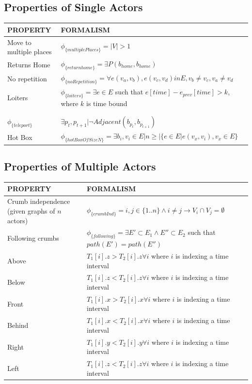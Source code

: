 \subsection{Properties of Single Actors}


\begin{tabular}{| p{2.8cm} | p{11.5cm} | }
\hline
PROPERTY & FORMALISM \\ \hline
Move to multiple places & $\phi_{\{multiplePlaces\}} = |V| > 1$ \\ \hline
Returns Home & $\phi_{\{returnhome\}} = \exists P(b_{home}, b_{home})$ \\ \hline
No repetition & $\phi_{\{noRepetition\}} = \forall e(v_a, v_b), e(v_c,v_d) in E, v_b \neq v_c, v_a \neq v_d$ \\ \hline
 Loiters & $\phi_{\{loiters\}} =  \exists e \in E$ such that $e[time] - e_{prev}[time] > k$, where $k$ is time bound \\ \hline
 & \\ \hline
 & \\ \hline
$\phi_{\{teleport\}}$ & $  \exists  p_t, p_{t+1} | \lnot Adjacent(b_{p_t}, b_{p_{t+1}})$ \\ \hline
Hot Box & $\phi_{\{hotBoxOfSizeN\}} = \exists b_i, v_i \in E | n \geq |\{e \in E | e(v_x, v_i), v_x \in E\}$ \\ \hline
\end{tabular}


\subsection{Properties of Multiple Actors}
\begin{tabular}{| p{2.8cm} | p{11.5cm} | }
\hline
PROPERTY & FORMALISM \\ \hline
 Crumb independence (given graphs of $n$ actors)& $\phi_{\{crumbInd\}} =  i,j \in \{1..n\} \land i \neq j \rightarrow V_i \cap V_j = \emptyset $ \\ \hline
 Following crumbs & $\phi_{\{following\}} =  \exists E' \subset E_1 \land E'' \subset E_2$ such that $path(E')=path(E'') $  \\ \hline
 Above & $T_1[i].z > T_2[i].z \forall i$ where $i$ is indexing a time interval\\ \hline
 Below & $T_1[i].z < T_2[i].z \forall i$ where $i$ is indexing a time interval\\ \hline
 Front & $T_1[i].x > T_2[i].x \forall i$ where $i$ is indexing a time interval\\ \hline
 Behind & $T_1[i].x < T_2[i].x \forall i$ where $i$ is indexing a time interval\\ \hline
 Right & $T_1[i].y < T_2[i].y \forall i$ where $i$ is indexing a time interval \\ \hline
 Left & $T_1[i].z < T_2[i].z \forall i$ where $i$ is indexing a time interval \\ \hline
\end{tabular}

